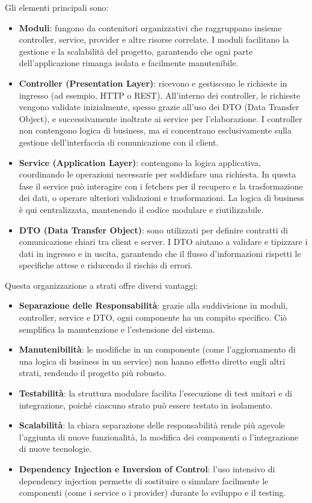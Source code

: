 Gli elementi principali sono:

\begin{itemize}
    \item \textbf{Moduli}: fungono da contenitori organizzativi che raggruppano insieme controller, service, provider e altre risorse correlate. I moduli facilitano la gestione e la scalabilità del progetto, garantendo che ogni parte dell'applicazione rimanga isolata e facilmente manutenibile.
    \item \textbf{Controller (Presentation Layer)}: ricevono e gestiscono le richieste in ingresso (ad esempio, HTTP o REST). All'interno dei controller, le richieste vengono validate inizialmente, spesso grazie all'uso dei DTO (Data Transfer Object), e successivamente inoltrate ai service per l'elaborazione. I controller non contengono logica di business, ma si concentrano esclusivamente sulla gestione dell'interfaccia di comunicazione con il client.
    \item \textbf{Service (Application Layer)}: contengono la logica applicativa, coordinando le operazioni necessarie per soddisfare una richiesta. In questa fase il service può interagire con i fetchers per il recupero e la trasformazione dei dati, o operare ulteriori validazioni e trasformazioni. La logica di business è qui centralizzata, mantenendo il codice modulare e riutilizzabile.
    \item \textbf{DTO (Data Transfer Object)}: sono utilizzati per definire contratti di comunicazione chiari tra client e server. I DTO aiutano a validare e tipizzare i dati in ingresso e in uscita, garantendo che il flusso d'informazioni rispetti le specifiche attese e riducendo il rischio di errori.
\end{itemize}

Questa organizzazione a strati offre diversi vantaggi:

\begin{itemize}
    \item \textbf{Separazione delle Responsabilità}: grazie alla suddivisione in moduli, controller, service e DTO, ogni componente ha un compito specifico. Ciò semplifica la manutenzione e l'estensione del sistema.
    \item \textbf{Manutenibilità}: le modifiche in un componente (come l'aggiornamento di una logica di business in un service) non hanno effetto diretto sugli altri strati, rendendo il progetto più robusto.
    \item \textbf{Testabilità}: la struttura modulare facilita l'esecuzione di test unitari e di integrazione, poiché ciascuno strato può essere testato in isolamento.
    \item \textbf{Scalabilità}: la chiara separazione delle responsabilità rende più agevole l'aggiunta di nuove funzionalità, la modifica dei componenti o l'integrazione di nuove tecnologie.
    \item \textbf{Dependency Injection e Inversion of Control}: l'uso intensivo di dependency injection permette di sostituire o simulare facilmente le componenti (come i service o i provider) durante lo sviluppo e il testing.
\end{itemize}
\newpage
